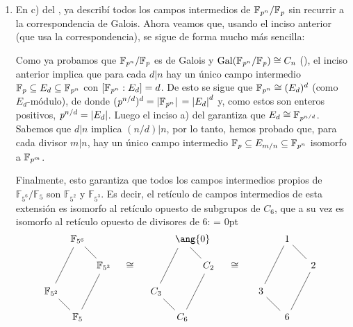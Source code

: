 \begin{sol}
\begin{enumerate}[label=\alph*)]
\item 
En c) del , ya describí todos los campos intermedios de $\mathbb{F}_{\operatorname{\textit{p}}^n}/\mathbb{F}_{\operatorname{\textit{p}}}$ sin recurrir a la correspondencia de Galois. Ahora veamos que, usando el inciso anterior (que usa la correspondencia), se sigue de forma mucho más sencilla:\par
Como ya probamos que $\mathbb{F}_{\operatorname{\textit{p}}^n}/\mathbb{F}_{\operatorname{\textit{p}}}$ es de Galois y $\operatorname{Gal}(\mathbb{F}_{\operatorname{\textit{p}}^n}/\mathbb{F}_{\operatorname{\textit{p}}}) \cong C_n$ (), el inciso anterior implica que para cada $d|n$ hay un único campo intermedio $\mathbb{F}_{\operatorname{\textit{p}}} \subseteq E_d \subseteq \mathbb{F}_{\operatorname{\textit{p}}^n}$ con $[\mathbb{F}_{\operatorname{\textit{p}}^n}:E_d] = d$. De esto se sigue que $\mathbb{F}_{\operatorname{\textit{p}}^n} \cong (E_d)^d$ (como $E_d\text{-módulo}$), de donde $(\operatorname{\textit{p}}^{n/d})^d = \abs*{\mathbb{F}_{\operatorname{\textit{p}}^n}} = \abs{E_d}^d$ y, como estos son enteros positivos, $\operatorname{\textit{p}}^{n/d} = \abs{E_d}$. Luego el inciso a) del  garantiza que $E_d \cong \mathbb{F}_{\operatorname{\textit{p}}^{n/d}}$. Sabemos que $d|n$ implica $(n/d) | n$, por lo tanto, hemos probado que, para cada divisor $m|n$, hay un único campo intermedio $\mathbb{F}_{\operatorname{\textit{p}}} \subseteq E_{m/n} \subseteq \mathbb{F}_{\operatorname{\textit{p}}^n}$ isomorfo a $\mathbb{F}_{\operatorname{\textit{p}}^m}$.\par
Finalmente, esto garantiza que todos los campos intermedios propios de $\mathbb{F}_{5^6}/\mathbb{F}_{5}$ son $\mathbb{F}_{5^2}$ y $\mathbb{F}_{5^3}$. Es decir, el retículo de campos intermedios de esta extensión es isomorfo al retículo opuesto de subgrupos de $C_6$, que a su vez es isomorfo al retículo opuesto de divisores de $6$:
{\mathsurround = 0pt
\[\begin{tikzcd}[%
    cells={inner sep=0pt, text width=1.5em, align=center},%
    column sep =small,%
    arrows={shorten >=1ex, shorten <=1ex}
]
	& {\mathbb{F}_{5^6}} &&&& {\ang{0}} &&&& 1 \\
	&& {\mathbb{F}_{5^3}} & \cong &&& {C_2} & \cong &&& 2 \\
	{\mathbb{F}_{5^2}} &&&& {C_3} &&&& 3 \\
	& {\mathbb{F}_{5}} &&&& {C_6} &&&& 6
	\arrow[no head, from=1-2, to=2-3]
	\arrow[no head, from=1-2, to=3-1]
	\arrow[no head, from=1-6, to=2-7]
	\arrow[no head, from=1-6, to=3-5]
	\arrow[no head, from=1-10, to=2-11]
	\arrow[no head, from=1-10, to=3-9]
	\arrow[no head, from=2-3, to=4-2]
	\arrow[no head, from=2-7, to=4-6]
	\arrow[no head, from=2-11, to=4-10]
	\arrow[no head, from=3-1, to=4-2]
	\arrow[no head, from=3-5, to=4-6]
	\arrow[no head, from=3-9, to=4-10]
\end{tikzcd}\]
}


\end{enumerate}
\end{sol}
